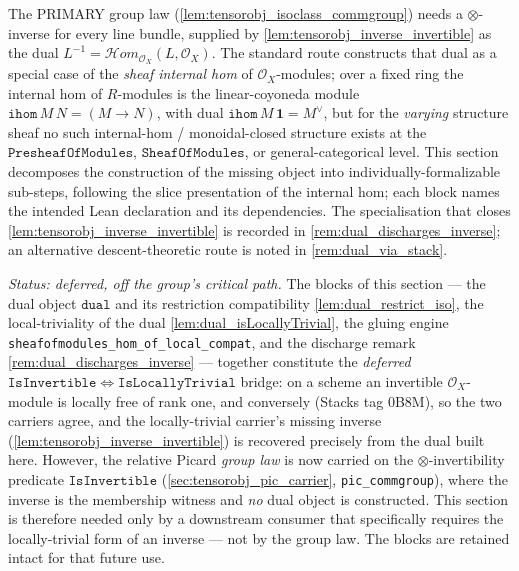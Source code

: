 The PRIMARY group law (\cref{lem:tensorobj_isoclass_commgroup}) needs a
\(\otimes\)-inverse for every line bundle, supplied by
\cref{lem:tensorobj_inverse_invertible} as the dual
\(L^{-1} = \mathcal{H}om_{\mathcal{O}_X}(L, \mathcal{O}_X)\). The standard route
constructs that dual as a special case of the \emph{sheaf internal hom} of
\(\mathcal{O}_X\)-modules; over a fixed ring the internal hom of \(R\)-modules is the
linear-coyoneda module \(\mathtt{ihom}\,M\,N = (M \to N)\), with dual
\(\mathtt{ihom}\,M\,\mathbf{1} = M^\vee\), but for the \emph{varying} structure sheaf
no such
internal-hom / monoidal-closed structure exists at the
\(\mathtt{PresheafOfModules}\), \(\mathtt{SheafOfModules}\), or general-categorical
level. This section decomposes the construction of the missing object into
individually-formalizable sub-steps, following the slice presentation of the internal
hom; each block names the intended Lean declaration and its dependencies. The
specialisation that closes \cref{lem:tensorobj_inverse_invertible} is recorded in
\cref{rem:dual_discharges_inverse}; an alternative descent-theoretic route is noted in
\cref{rem:dual_via_stack}.

\emph{Status: deferred, off the group's critical path.} The blocks of this section
--- the dual object \(\mathtt{dual}\) and its restriction compatibility
\cref{lem:dual_restrict_iso}, the local-triviality of the dual
\cref{lem:dual_isLocallyTrivial}, the gluing engine
\texttt{sheafofmodules\_hom\_of\_local\_compat}, and the discharge remark
\cref{rem:dual_discharges_inverse} --- together constitute the \emph{deferred}
\(\mathtt{IsInvertible} \Leftrightarrow \mathtt{IsLocallyTrivial}\) bridge: on a
scheme an invertible \(\mathcal{O}_X\)-module is locally free of rank one, and
conversely (Stacks tag 0B8M), so the two carriers agree, and the locally-trivial
carrier's missing inverse (\cref{lem:tensorobj_inverse_invertible}) is recovered
precisely from the dual built here.
However, the relative Picard \emph{group law} is now carried on the
\(\otimes\)-invertibility predicate \(\mathtt{IsInvertible}\)
(\cref{sec:tensorobj_pic_carrier}, \texttt{pic\_commgroup}), where the inverse is
the membership witness and \emph{no} dual object is constructed. This section is
therefore needed only by a downstream consumer that specifically requires the
locally-trivial form of an inverse --- not by the group law. The blocks are retained
intact for that future use.

